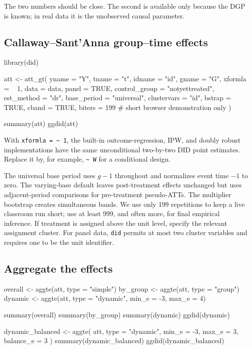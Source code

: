 The two numbers should be close.  The second is available only because the DGP
is known; in real data it is the unobserved causal parameter.

\subsection{Callaway--Sant'Anna group--time effects}

\begin{rcode}
library(did)

att <- att_gt(
  yname = "Y", tname = "t", idname = "id", gname = "G",
  xformla = ~ 1, data = data, panel = TRUE,
  control_group = "notyettreated", est_method = "dr",
  base_period = "universal", clustervars = "id",
  bstrap = TRUE, cband = TRUE,
  biters = 199                 # short browser demonstration only
)

summary(att)
ggdid(att)
\end{rcode}

With \texttt{xformla = \textasciitilde{} 1}, the built-in outcome-regression,
IPW, and doubly robust implementations have the same unconditional two-by-two
DID point estimates.  Replace it by, for example,
\texttt{\textasciitilde{} W} for a conditional design.

The universal base period uses $g-1$ throughout and normalizes event time $-1$
to zero.  The varying-base default leaves post-treatment effects unchanged but
uses adjacent-period comparisons for pre-treatment pseudo-ATTs.  The multiplier
bootstrap creates simultaneous bands.  We use only 199 repetitions to keep a
live classroom run short; use at least 999, and often more, for final empirical
inference.  If treatment is assigned above the unit level, specify the relevant
assignment cluster.  For panel data, \texttt{did} permits at most two cluster
variables and requires one to be the unit identifier.

\subsection{Aggregate the effects}

\begin{rcode}
overall <- aggte(att, type = "simple")
by_group <- aggte(att, type = "group")
dynamic <- aggte(att, type = "dynamic", min_e = -3, max_e = 4)

summary(overall)
summary(by_group)
summary(dynamic)
ggdid(dynamic)

dynamic_balanced <- aggte(
  att, type = "dynamic",
  min_e = -3, max_e = 3,
  balance_e = 3
)
summary(dynamic_balanced)
ggdid(dynamic_balanced)
\end{rcode}

